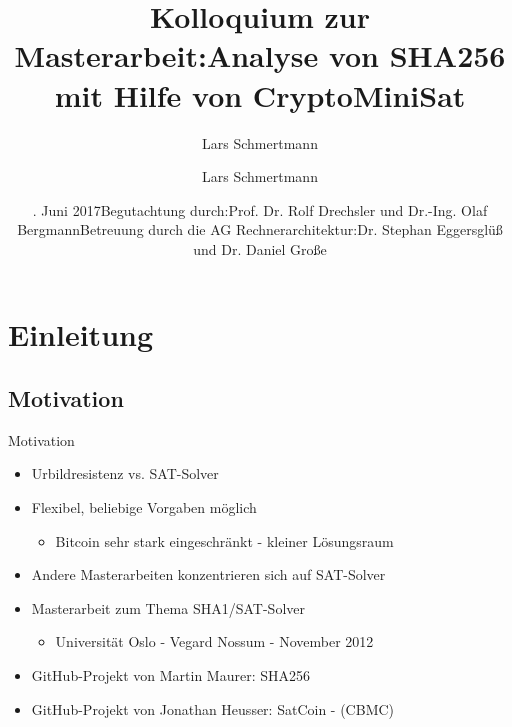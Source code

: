\documentclass{beamer}
\title[Analyse von SHA256 mit Hilfe von CryptoMiniSat]{Kolloquium zur Masterarbeit:\newline Analyse von SHA256 mit Hilfe von CryptoMiniSat}
\author{Lars Schmertmann}
\date{\vspace*{-1cm}\newline 14. Juni 2017\newline\newline Begutachtung durch:\newline Prof. Dr. Rolf Drechsler und Dr.-Ing. Olaf Bergmann\newline \newline Betreuung durch die AG Rechnerarchitektur:\newline Dr. Stephan Eggersglüß und Dr. Daniel Große}
\begin{document}
\maketitle

\author{Lars Schmertmann}


\section{Einleitung}
  \subsection{Motivation}
    \begin{frame}{Motivation}
      \begin{itemize}
        \setlength{\itemsep}{12pt}
        \item Urbildresistenz vs. SAT-Solver
        \item Flexibel, beliebige Vorgaben möglich
        \begin{itemize}
          \item Bitcoin sehr stark eingeschränkt - kleiner Lösungsraum
        \end{itemize}
        \item Andere Masterarbeiten konzentrieren sich auf SAT-Solver
        \item Masterarbeit zum Thema SHA1/SAT-Solver
        \begin{itemize}
          \item Universität Oslo - Vegard Nossum - November 2012
        \end{itemize}
        \item GitHub-Projekt von Martin Maurer: SHA256
        \item GitHub-Projekt von Jonathan Heusser: SatCoin - (CBMC)
      \end{itemize}
    \end{frame}
\end{document}
